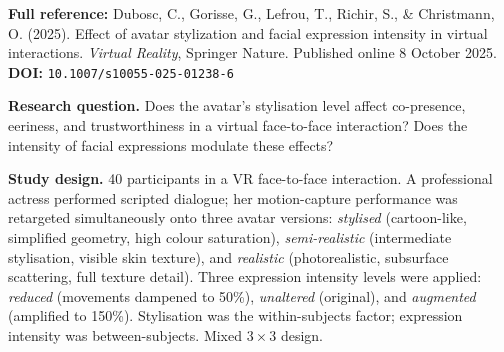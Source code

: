 \documentclass[11pt, a4paper]{article}
\begin{document}
\begin{refbox}
\textbf{Full reference:} Dubosc, C., Gorisse, G., Lefrou, T., Richir, S., \& Christmann, O. (2025). Effect of avatar stylization and facial expression intensity in virtual interactions. \textit{Virtual Reality}, Springer Nature. Published online 8 October 2025.\\[4pt]
\textbf{DOI:} \texttt{10.1007/s10055-025-01238-6}
\end{refbox}

\textbf{Research question.} Does the avatar's stylisation level affect co-presence, eeriness, and trustworthiness in a virtual face-to-face interaction? Does the intensity of facial expressions modulate these effects?

\textbf{Study design.} 40 participants in a VR face-to-face interaction. A professional actress performed scripted dialogue; her motion-capture performance was retargeted simultaneously onto three avatar versions: \textit{stylised} (cartoon-like, simplified geometry, high colour saturation), \textit{semi-realistic} (intermediate stylisation, visible skin texture), and \textit{realistic} (photorealistic, subsurface scattering, full texture detail). Three expression intensity levels were applied: \textit{reduced} (movements dampened to 50\%), \textit{unaltered} (original), and \textit{augmented} (amplified to 150\%). Stylisation was the within-subjects factor; expression intensity was between-subjects. Mixed $3 \times 3$ design.
\end{document}
